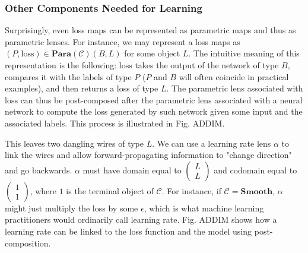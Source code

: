 \documentclass[11pt,a4paper,openright,twoside]{report}
\theoremstyle{plain}
\theoremstyle{definition}
\begin{document}
\subsubsection{Other Components Needed for Learning}


Surprisingly, even loss maps can be represented as parametric maps and thus as parametric lenses.
For instance, we may represent a loss maps as $(P,\mathrm{loss}) \in \mathbf{Para}(\mathcal{C})(B,L)$ for some object $L$. The intuitive meaning of this representation is the following: $\mathrm{loss}$ takes the output of the network of type $B$, compares it with the labels of type $P$ ($P$ and $B$ will often coincide in practical examples), and then returns a loss of type $L$. The parametric lens associated with $\mathrm{loss}$ can thus be post-composed after the parametric lens associated with a neural network to compute the loss generated by such network given some input and the associated labels. This process is illustrated in Fig. ADDIM.


This leaves two dangling wires of type $L$. We can use a learning rate lens $\alpha$ to link the wires and allow forward-propagating information to "change direction" and go backwards. $\alpha$ must have domain equal to $\left( \begin{smallmatrix} L \\ L \end{smallmatrix} \right)$ and codomain equal to $\left(\begin{smallmatrix} 1 \\ 1 \end{smallmatrix}\right)$, where $1$ is the terminal object of $\mathcal{C}$. For instance, if $\mathcal{C} = \mathbf{Smooth}$, $\alpha$ might just multiply the loss by some $\epsilon$, which is what machine learning practitioners would ordinarily call learning rate. Fig. ADDIM shows how a learning rate can be linked to the loss function and the model using post-composition.
\end{document}

